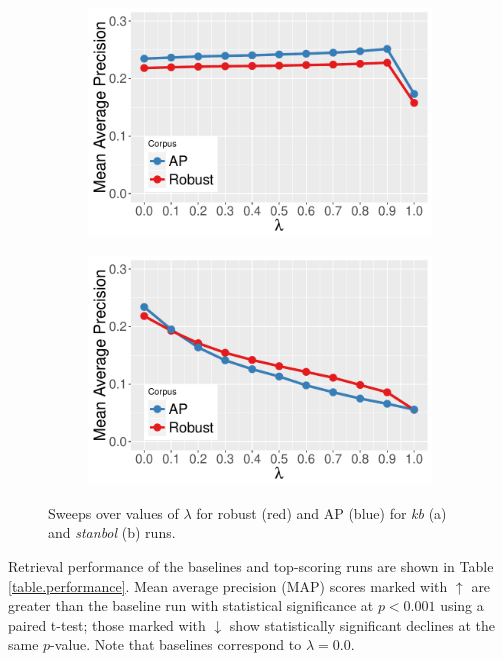 \documentclass{sig-alternate}
\begin{document}
\begin{figure}
\centering
\begin{subfigure}{.5\columnwidth}
\centering
\includegraphics[width=\textwidth]{figures/sweep-ql.pdf}
\end{subfigure}%
\begin{subfigure}{.5\columnwidth}
\centering
\includegraphics[width=\textwidth]{figures/sweep-stanbol.pdf}
\end{subfigure}
\caption{Sweeps over values of $\lambda$ for robust (red) and AP (blue) for \textit{kb} (a) and \textit{stanbol} (b) runs.}
\label{figure.sweeps-ql}
\end{figure}

Retrieval performance of the baselines and top-scoring runs are shown in Table \ref{table.performance}. Mean average precision (MAP) scores marked with $\uparrow$ are greater than the baseline run with statistical significance at $p < 0.001$ using a paired t-test; those marked with $\downarrow$ show statistically significant declines at the same $p$-value. Note that baselines correspond to $\lambda = 0.0$. 
\end{document}
